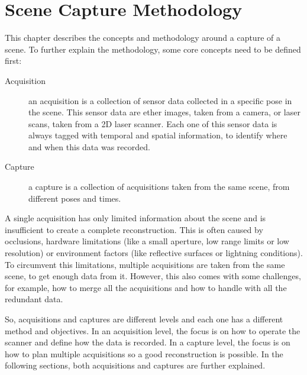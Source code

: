 \chapter{Scene Capture Methodology}
\label{chapter:scene_capture_methodology}

This chapter describes the concepts and methodology around a capture of a scene. To further explain the methodology, some core concepts need to be defined first:

\begin{description}
    
    \item[Acquisition]
        an acquisition is a collection of sensor data collected in a specific pose in the scene. This sensor data are ether images, taken from a camera, or laser scans, taken from a 2D laser scanner. Each one of this sensor data is always tagged with temporal and spatial information, to identify where and when this data was recorded.
    
    \item[Capture]
        a capture is a collection of acquisitions taken from the same scene, from different poses and times.

\end{description}

A single acquisition has only limited information about the scene and is insufficient to create a complete reconstruction. This is often caused by occlusions, hardware limitations (like a small aperture, low range limits or low resolution) or environment factors (like reflective surfaces or lightning conditions). To circumvent this limitations, multiple acquisitions are taken from the same scene, to get enough data from it. However, this also comes with some challenges, for example, how to merge all the acquisitions and how to handle with all the redundant data.

So, acquisitions and captures are different levels and each one has a different method and objectives. In an acquisition level, the focus is on how to operate the scanner and define how the data is recorded. In a capture level, the focus is on how to plan multiple acquisitions so a good reconstruction is possible. In the following sections, both acquisitions and captures are further explained.

